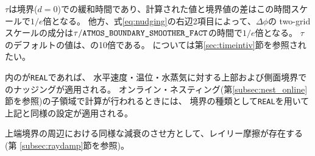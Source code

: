 $\tau$は境界($d=0$)での緩和時間であり、計算された値と境界値の差はこの時間スケールで$1/e$倍となる。
他方、式\ref{eq:nudging}の右辺2項目によって、$\Delta \phi$の two-grid スケールの成分は$\tau/\nmitemeq{ATMOS_BOUNDARY_SMOOTHER_FACT}$の時間で$1/e$倍となる。
$\tau$のデフォルトの値は、の10倍である。
については第\ref{sec:timeintiv}節を参照されたい。


内のが\verb|REAL|であれば、
水平速度・温位・水蒸気に対する上部および側面境界でのナッジングが適用される。
オンライン・ネスティング(第\ref{subsec:nest_online}節を参照)の子領域で計算が行われるときには、
境界の種類として\verb|REAL|を用いて上記と同様の設定が適用される。

上端境界の周辺における同様な減衰のさせ方として、レイリー摩擦が存在する(第 \ref{subsec:raydamp}節を参照)。
